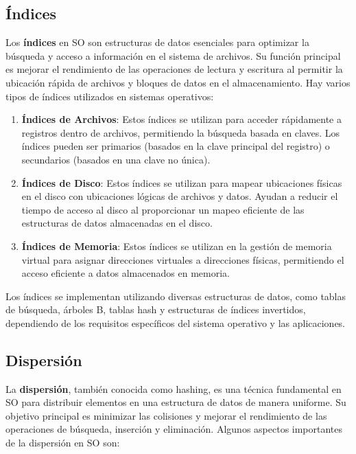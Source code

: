\documentclass[12pt, a4paper]{article} %
\begin{document}
\subsection{Índices}

Los \textbf{índices} en SO son estructuras de datos esenciales para optimizar la búsqueda y acceso a información en el sistema de archivos. Su función principal es mejorar el rendimiento de las operaciones de lectura y escritura al permitir la ubicación rápida de archivos y bloques de datos en el almacenamiento. Hay varios tipos de índices utilizados en sistemas operativos:

\begin{enumerate}

	\item \textbf{Índices de Archivos}: Estos índices se utilizan para acceder rápidamente a registros dentro de archivos, permitiendo la búsqueda basada en claves. Los índices pueden ser primarios (basados en la clave principal del registro) o secundarios (basados en una clave no única).
	\item \textbf{Índices de Disco}: Estos índices se utilizan para mapear ubicaciones físicas en el disco con ubicaciones lógicas de archivos y datos. Ayudan a reducir el tiempo de acceso al disco al proporcionar un mapeo eficiente de las estructuras de datos almacenadas en el disco.
	\item \textbf{Índices de Memoria}: Estos índices se utilizan en la gestión de memoria virtual para asignar direcciones virtuales a direcciones físicas, permitiendo el acceso eficiente a datos almacenados en memoria.
\end{enumerate}

Los índices se implementan utilizando diversas estructuras de datos, como tablas de búsqueda, árboles B, tablas hash y estructuras de índices invertidos, dependiendo de los requisitos específicos del sistema operativo y las aplicaciones.

\subsection{Dispersión}

La \textbf{dispersión}, también conocida como hashing, es una técnica fundamental en SO para distribuir elementos en una estructura de datos de manera uniforme. Su objetivo principal es minimizar las colisiones y mejorar el rendimiento de las operaciones de búsqueda, inserción y eliminación. Algunos aspectos importantes de la dispersión en SO son:
\end{document}
